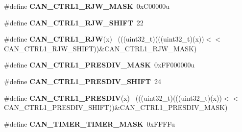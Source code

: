 \begin{DoxyCompactItemize}
\item 
\hypertarget{group___c_a_n___register___masks_ga10512d44b72e4fcf8fff8052dba9fd3a}{}\#define {\bfseries C\+A\+N\+\_\+\+C\+T\+R\+L1\+\_\+\+R\+J\+W\+\_\+\+M\+A\+S\+K}~0x\+C00000u\label{group___c_a_n___register___masks_ga10512d44b72e4fcf8fff8052dba9fd3a}

\item 
\hypertarget{group___c_a_n___register___masks_ga6fbcc0f866380f763269138136a2a92e}{}\#define {\bfseries C\+A\+N\+\_\+\+C\+T\+R\+L1\+\_\+\+R\+J\+W\+\_\+\+S\+H\+I\+F\+T}~22\label{group___c_a_n___register___masks_ga6fbcc0f866380f763269138136a2a92e}

\item 
\hypertarget{group___c_a_n___register___masks_ga3bb08577b4b9ee2cfba3a2f21f840942}{}\#define {\bfseries C\+A\+N\+\_\+\+C\+T\+R\+L1\+\_\+\+R\+J\+W}(x)                                              ~(((uint32\+\_\+t)(((uint32\+\_\+t)(x))$<$$<$C\+A\+N\+\_\+\+C\+T\+R\+L1\+\_\+\+R\+J\+W\+\_\+\+S\+H\+I\+F\+T))\&C\+A\+N\+\_\+\+C\+T\+R\+L1\+\_\+\+R\+J\+W\+\_\+\+M\+A\+S\+K)\label{group___c_a_n___register___masks_ga3bb08577b4b9ee2cfba3a2f21f840942}

\item 
\hypertarget{group___c_a_n___register___masks_gad8d384c87d48a3fc0b1ae52949823818}{}\#define {\bfseries C\+A\+N\+\_\+\+C\+T\+R\+L1\+\_\+\+P\+R\+E\+S\+D\+I\+V\+\_\+\+M\+A\+S\+K}~0x\+F\+F000000u\label{group___c_a_n___register___masks_gad8d384c87d48a3fc0b1ae52949823818}

\item 
\hypertarget{group___c_a_n___register___masks_ga762ed1bd89d4db4a6f34a12f8ae0afcf}{}\#define {\bfseries C\+A\+N\+\_\+\+C\+T\+R\+L1\+\_\+\+P\+R\+E\+S\+D\+I\+V\+\_\+\+S\+H\+I\+F\+T}~24\label{group___c_a_n___register___masks_ga762ed1bd89d4db4a6f34a12f8ae0afcf}

\item 
\hypertarget{group___c_a_n___register___masks_gae4f2537b17cd4d3cf314a10cec573fbd}{}\#define {\bfseries C\+A\+N\+\_\+\+C\+T\+R\+L1\+\_\+\+P\+R\+E\+S\+D\+I\+V}(x)                                      ~(((uint32\+\_\+t)(((uint32\+\_\+t)(x))$<$$<$C\+A\+N\+\_\+\+C\+T\+R\+L1\+\_\+\+P\+R\+E\+S\+D\+I\+V\+\_\+\+S\+H\+I\+F\+T))\&C\+A\+N\+\_\+\+C\+T\+R\+L1\+\_\+\+P\+R\+E\+S\+D\+I\+V\+\_\+\+M\+A\+S\+K)\label{group___c_a_n___register___masks_gae4f2537b17cd4d3cf314a10cec573fbd}

\item 
\hypertarget{group___c_a_n___register___masks_gaa7323a19c6c05a13fdf8489331e9671f}{}\#define {\bfseries C\+A\+N\+\_\+\+T\+I\+M\+E\+R\+\_\+\+T\+I\+M\+E\+R\+\_\+\+M\+A\+S\+K}~0x\+F\+F\+F\+Fu\label{group___c_a_n___register___masks_gaa7323a19c6c05a13fdf8489331e9671f}


\end{DoxyCompactItemize}
